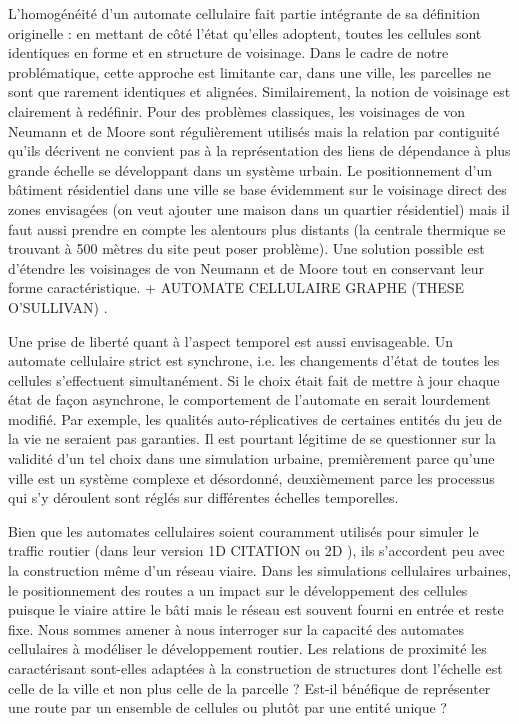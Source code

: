 \documentclass[10pt]{article}
\begin{document}
L'homogénéité d'un automate cellulaire fait partie intégrante de sa
définition originelle : en mettant de côté l'état qu'elles adoptent,
toutes les cellules sont identiques en forme et en structure de
voisinage. Dans le cadre de notre problématique, cette approche est
limitante car, dans une ville, les parcelles ne sont que rarement
identiques et alignées. Similairement, la notion de voisinage est
clairement à redéfinir. Pour des problèmes classiques, les voisinages
de von Neumann et de Moore sont régulièrement utilisés mais la
relation par contiguité qu'ils décrivent ne convient pas à la
représentation des liens de dépendance à plus grande échelle se
développant dans un système urbain. Le positionnement d'un bâtiment
résidentiel dans une ville se base évidemment sur le voisinage direct
des zones envisagées (on veut ajouter une maison dans un quartier
résidentiel) mais il faut aussi prendre en compte les alentours plus
distants (la centrale thermique se trouvant à 500 mètres du site peut
poser problème). Une solution possible est d'étendre les voisinages de
von Neumann et de Moore tout en conservant leur forme
caractéristique. + AUTOMATE CELLULAIRE GRAPHE (THESE O'SULLIVAN)
\cite{O'Sullivan2000,0'Sullivan2001}.

Une prise de liberté quant à l'aspect temporel est aussi
envisageable. Un automate cellulaire strict est synchrone, i.e. les
changements d'état de toutes les cellules s'effectuent
simultanément. Si le choix était fait de mettre à jour chaque état de
façon asynchrone, le comportement de l'automate en serait lourdement
modifié. Par exemple, les qualités auto-réplicatives de certaines
entités du jeu de la vie ne seraient pas garanties. Il est pourtant
légitime de se questionner sur la validité d'un tel choix dans une
simulation urbaine, premièrement parce qu'une ville est un système
complexe et désordonné, deuxièmement parce les processus qui s'y
déroulent sont réglés sur différentes échelles temporelles.

Bien que les automates cellulaires soient couramment utilisés pour
simuler le traffic routier (dans leur version 1D CITATION ou 2D
\cite{Queloz1996}), ils s'accordent peu avec la construction même d'un
réseau viaire. Dans les simulations cellulaires urbaines, le
positionnement des routes a un impact sur le développement des
cellules puisque le viaire attire le bâti mais le réseau est souvent
fourni en entrée et reste fixe. Nous sommes amener à nous interroger
sur la capacité des automates cellulaires à modéliser le développement
routier. Les relations de proximité les caractérisant sont-elles
adaptées à la construction de structures dont l'échelle est celle de
la ville et non plus celle de la parcelle ? Est-il bénéfique de
représenter une route par un ensemble de cellules ou plutôt par une
entité unique ?
\end{document}
